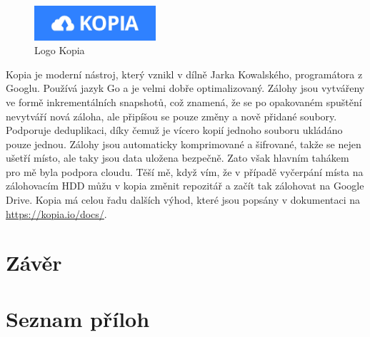 \documentclass[a4paper,12pt, oneside]{book}
\begin{document}
\begin{figure}
	\centering
	\includegraphics[width=0.4\textwidth]{img/kopia.jpg}
	\caption{Logo Kopia}
\end{figure}
Kopia je moderní nástroj, který vznikl v dílně Jarka Kowalského, 
programátora z Googlu. Používá jazyk Go a je velmi dobře optimalizovaný.
\cite{Kopia-GitHub}
Zálohy jsou vytvářeny ve formě inkrementálních snapshotů,
což znamená, že se po opakovaném spuštění nevytváří nová záloha, ale 
připíšou se pouze změny a nově přidané soubory. Podporuje deduplikaci,
díky čemuž je vícero kopií jednoho souboru ukládáno pouze jednou. 
Zálohy jsou automaticky komprimované a šifrované, takže se nejen ušetří 
místo, ale taky jsou data uložena bezpečně. \cite{Kopia-Docs} Zato však hlavním
tahákem pro mě byla podpora cloudu. Těší mě, když vím, že v případě vyčerpání
místa na 
zálohovacím HDD můžu v kopia změnit repozitář a začít tak zálohovat na 
Google Drive.
Kopia má celou řadu dalších výhod,
které jsou popsány v dokumentaci na \url{https://kopia.io/docs/}.

















\chapter{Závěr}



	\nocite{*}
\printbibliography[
	heading=bibintoc,
	title={Seznam zdrojů}
]

\listoffigures
\cleardoublepage
{}


\chapter{Seznam příloh}
\end{document}
